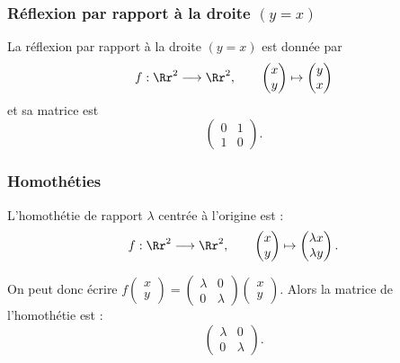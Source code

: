 \documentclass[class=report,crop=false]{standalone}
\begin{document}
\subsubsection{Réflexion par rapport à la droite $(y = x)$}


La réflexion par rapport à la droite $(y=x)$ est donnée par
$$f: \Rr^2 \longrightarrow \Rr^2, \qquad
\begin{pmatrix}x\\y\end{pmatrix} \mapsto \begin{pmatrix}y\\x\end{pmatrix}$$
et sa matrice est
\[\begin{pmatrix}0 & 1\\1 & 0\end{pmatrix}.\]


\subsubsection{Homothéties}


L'homothétie de rapport $\lambda$ centrée à l'origine est :
$$f: \Rr^2 \longrightarrow \Rr^2, \qquad
\begin{pmatrix}x\\y\end{pmatrix} \mapsto \begin{pmatrix} \lambda x \\ \lambda y \end{pmatrix}.$$

On peut donc écrire
$f\left(\begin{smallmatrix} x \\ y \end{smallmatrix}\right) =
\left(\begin{smallmatrix} \lambda & 0 \\ 0 & \lambda \end{smallmatrix}\right)
\left(\begin{smallmatrix} x \\ y \end{smallmatrix}\right)$.
Alors la matrice de l'homothétie est :
\[\begin{pmatrix} \lambda & 0 \\ 0 & \lambda \end{pmatrix}.\]
\end{document}
